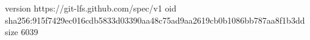 version https://git-lfs.github.com/spec/v1
oid sha256:915f7429ec016cdb5833d03390aa48c75ad9aa2619cb0b1086bb787aa8f1b3dd
size 6039

